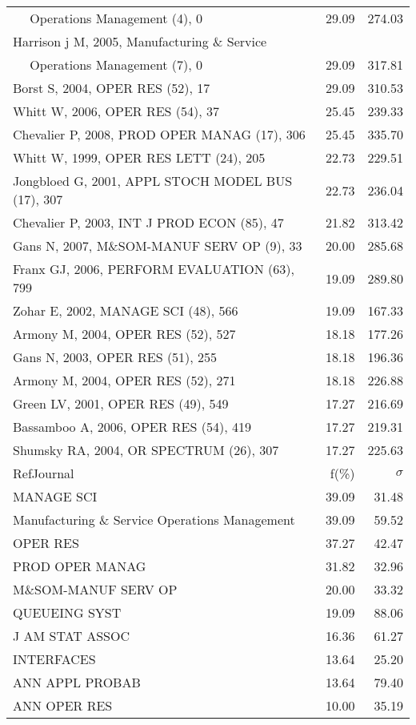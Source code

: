 \documentclass[a4paper,11pt]{report}
\begin{document}
\begin{landscape}
\begin{table}[!ht]
{\begin{tabular}{|l r r|}
$\quad$ Operations Management (4), 0 & 29.09 & 274.03\\
Harrison j M, 2005, Manufacturing \& Service &  & \\
$\quad$ Operations Management (7), 0 & 29.09 & 317.81\\
Borst S, 2004, OPER RES (52), 17 & 29.09 & 310.53\\
Whitt W, 2006, OPER RES (54), 37 & 25.45 & 239.33\\
Chevalier P, 2008, PROD OPER MANAG (17), 306 & 25.45 & 335.70\\
Whitt W, 1999, OPER RES LETT (24), 205 & 22.73 & 229.51\\
Jongbloed G, 2001, APPL STOCH MODEL BUS (17), 307 & 22.73 & 236.04\\
Chevalier P, 2003, INT J PROD ECON (85), 47 & 21.82 & 313.42\\
Gans N, 2007, M\&SOM-MANUF SERV OP (9), 33 & 20.00 & 285.68\\
Franx GJ, 2006, PERFORM EVALUATION (63), 799 & 19.09 & 289.80\\
Zohar E, 2002, MANAGE SCI (48), 566 & 19.09 & 167.33\\
Armony M, 2004, OPER RES (52), 527 & 18.18 & 177.26\\
Gans N, 2003, OPER RES (51), 255 & 18.18 & 196.36\\
Armony M, 2004, OPER RES (52), 271 & 18.18 & 226.88\\
Green LV, 2001, OPER RES (49), 549 & 17.27 & 216.69\\
Bassamboo A, 2006, OPER RES (54), 419 & 17.27 & 219.31\\
Shumsky RA, 2004, OR SPECTRUM (26), 307 & 17.27 & 225.63\\
\hline
\hline
RefJournal & f(\%) & $\sigma$\\
\hline
MANAGE SCI & 39.09 & 31.48\\
Manufacturing \& Service Operations Management & 39.09 & 59.52\\
OPER RES & 37.27 & 42.47\\
PROD OPER MANAG & 31.82 & 32.96\\
M\&SOM-MANUF SERV OP & 20.00 & 33.32\\
QUEUEING SYST & 19.09 & 88.06\\
J AM STAT ASSOC & 16.36 & 61.27\\
INTERFACES & 13.64 & 25.20\\
ANN APPL PROBAB & 13.64 & 79.40\\
ANN OPER RES & 10.00 & 35.19\\
\hline
\end{tabular}
}
\end{table}


\end{landscape}
\end{document}
